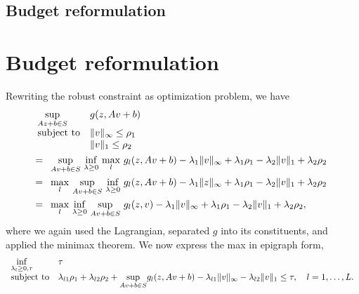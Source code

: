 \ifpreprint
\subsection{Budget reformulation}
\else 
\section{Budget reformulation}
\fi
\label{apx:budproof}
Rewriting the robust constraint as optimization problem, we have
\begin{equation*}
	\begin{aligned}
& \begin{array}[t]{ll}
	\underset{Az+b\in S}{\sup} & g(z,Av+b) \\
	\mbox{subject to} & \| v \|_\infty \le \rho_1\\
	 & \| v \|_1 \le \rho_2\\
\end{array}\\
&= \begin{array}[t]{ll}
	\underset{Av+b\in S}{\sup}~ \underset{\lambda \geq 0}{\inf} ~\underset{l}{\max} ~ g_l(z,Av+b)  - \lambda_1\| v \|_\infty  + \lambda_1\rho_1 - \lambda_2\| v\|_1  + \lambda_2\rho_2\\
	\end{array}\\
 &=  \begin{array}[t]{ll}
	\underset{l}{\max} ~\underset{Av+b\in S}{\sup} ~ \underset{\lambda \geq 0}{\inf} ~g_l(z,Av+b)  - \lambda_1\| z \|_\infty  + \lambda_1\rho_1 - \lambda_2\| v\|_1  + \lambda_2\rho_2\\
	\end{array}\\
	&= \begin{array}[t]{ll}
		\underset{l}{\max}~\underset{\lambda \geq 0}{\inf}~\underset{Av+b\in S}{\sup} ~g_l(z,v)  - \lambda_1\| v\|_\infty  + \lambda_1\rho_1 - \lambda_2\| v \|_1  + \lambda_2\rho_2,\\
		\end{array}\\
\end{aligned}
\end{equation*}
where we again used the Lagrangian, separated $g$ into its constituents, and applied the minimax theorem. We now express the max in epigraph form,
\begin{equation*}
	\begin{aligned}
	\begin{array}[t]{ll}
		\underset{\lambda_{l} \geq 0, \tau}{\inf} & \tau \\
		\mbox{subject to} & \lambda_{l1}\rho_1 + \lambda_{l2}\rho_2 + \underset{Av+b\in S}{\sup } g_l(z,Av+b) -\lambda_{l1}\| v \|_\infty - \lambda_{l2}\| v \|_1 \leq \tau, \quad l = 1,\dots,L.
	\end{array}
	\end{aligned}
	\end{equation*}

